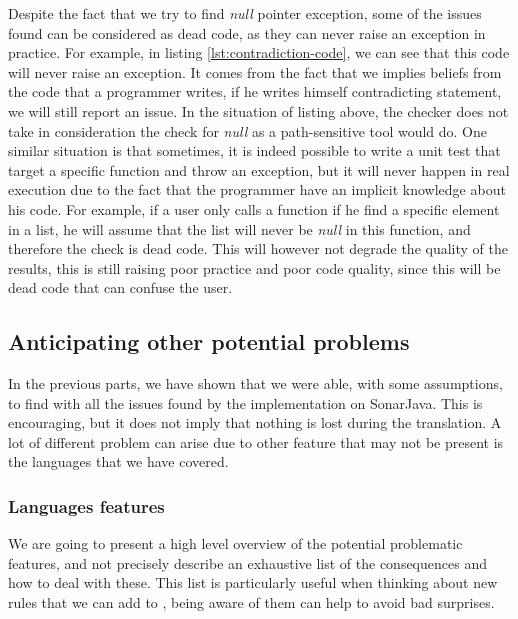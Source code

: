 Despite the fact that we try to find \emph{null} pointer exception, some of the issues found can be considered as dead code, as they can never raise an exception in practice. 
For example, in listing \ref{lst:contradiction-code}, we can see that this code will never raise an exception. 
It comes from the fact that we implies beliefs from the code that a programmer writes, if he writes himself contradicting statement, we will still report an issue. 
In the situation of listing above, the checker does not take in consideration the check for \emph{null} as a path-sensitive tool would do. \newline
One similar situation is that sometimes, it is indeed possible to write a unit test that target a specific function and throw an exception, but it will never happen in real execution due to the fact that the programmer have an implicit knowledge about his code. 
For example, if a user only calls a function if he find a specific element in a list, he will assume that the list will never be \emph{null} in this function, and therefore the check is dead code. 
This will however not degrade the quality of the results, this is still raising poor practice and poor code quality, since this will be dead code that can confuse the user.

\subsection{Anticipating other potential problems}
\label{subsec:anticipating_problems}

In the previous parts, we have shown that we were able, with some assumptions, to find with \slang{} all the issues found by the implementation on SonarJava. 
This is encouraging, but it does not imply that nothing is lost during the translation.
A lot of different problem can arise due to other feature that may not be present is the languages that we have covered.

\subsubsection{Languages features}
\label{subsubsec:other_language_features}

We are going to present a high level overview of the potential problematic features, and not precisely describe an exhaustive list of the consequences and how to deal with these.
This list is particularly useful when thinking about new rules that we can add to \slang, being aware of them can help to avoid bad surprises.

